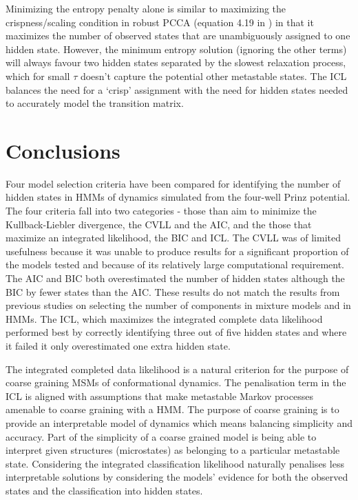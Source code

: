 Minimizing the entropy penalty alone is similar to maximizing the crispness/scaling condition  in robust PCCA (equation 4.19 in \cite{deuflhardRobustPerronCluster2005b}) in that it maximizes the number of  observed states that are unambiguously assigned to one hidden state. However, the minimum entropy solution (ignoring the other terms) will always favour two hidden states separated by the slowest relaxation process, which for small $\tau$ doesn't capture the potential other metastable states. The ICL balances the need for a `crisp' assignment with the need for hidden states needed to accurately  model the transition matrix. 
\section{Conclusions}\label{sec:hmm_conclusions}
Four model selection criteria have been compared for identifying the number of hidden states in HMMs of dynamics simulated from the four-well Prinz potential. The four criteria fall into two categories - those than aim to minimize the Kullback-Liebler divergence, the CVLL and the AIC, and the those that maximize an integrated likelihood, the BIC and ICL. The CVLL was of limited usefulness because it was unable to produce results for a significant proportion of the models tested and because of its relatively large computational requirement. The AIC and BIC both overestimated the number of hidden states although the BIC by fewer states than the AIC. These results do not match the results from previous studies on selecting the number of components in mixture models and in HMMs. The ICL, which maximizes the integrated complete data likelihood performed best by correctly identifying three out of five hidden states and where it failed it only overestimated one extra hidden state. 

The integrated completed data likelihood is a natural criterion for the purpose of coarse graining  MSMs of conformational dynamics. The penalisation term in the ICL is aligned with assumptions that make metastable Markov processes amenable to coarse graining with a HMM. The purpose of coarse graining is to provide an interpretable model of dynamics which means balancing simplicity and accuracy. Part of the simplicity of a coarse grained model is being able to interpret given structures (microstates) as belonging to a particular metastable state. Considering the integrated classification likelihood naturally penalises less interpretable solutions by considering the models' evidence for both the observed states and the classification into hidden states. 

